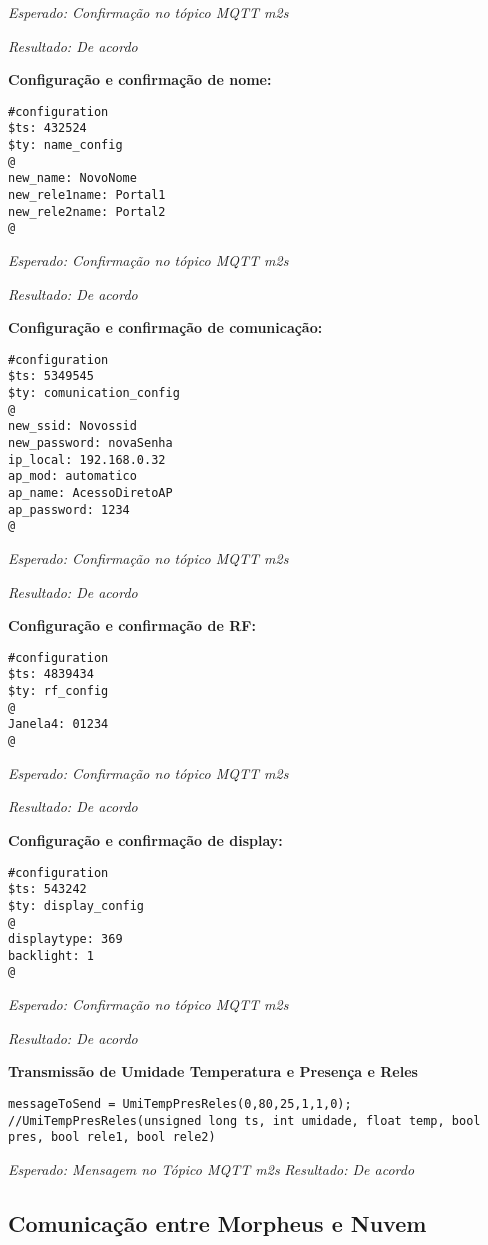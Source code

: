 \textit{Esperado: Confirmação no tópico MQTT m2s}

\textit{Resultado: De acordo}

\textbf{Configuração e confirmação de nome:}
\begin{lstlisting}
#configuration
$ts: 432524
$ty: name_config
@
new_name: NovoNome
new_rele1name: Portal1
new_rele2name: Portal2
@
\end{lstlisting}

\textit{Esperado: Confirmação no tópico MQTT m2s}

\textit{Resultado: De acordo}

\textbf{Configuração e confirmação de comunicação:}
\begin{lstlisting}
#configuration
$ts: 5349545
$ty: comunication_config
@
new_ssid: Novossid
new_password: novaSenha
ip_local: 192.168.0.32
ap_mod: automatico
ap_name: AcessoDiretoAP
ap_password: 1234
@
\end{lstlisting}

\textit{Esperado: Confirmação no tópico MQTT m2s}

\textit{Resultado: De acordo}

\textbf{Configuração e confirmação de RF:}
\begin{lstlisting}
#configuration
$ts: 4839434
$ty: rf_config
@
Janela4: 01234
@
\end{lstlisting}

\textit{Esperado: Confirmação no tópico MQTT m2s}

\textit{Resultado: De acordo}

\textbf{Configuração e confirmação de display:}
\begin{lstlisting}
#configuration
$ts: 543242
$ty: display_config
@
displaytype: 369
backlight: 1
@
\end{lstlisting}

\textit{Esperado: Confirmação no tópico MQTT m2s}

\textit{Resultado: De acordo}

\textbf{Transmissão de Umidade Temperatura e Presença e Reles}
\begin{lstlisting}
messageToSend = UmiTempPresReles(0,80,25,1,1,0);
//UmiTempPresReles(unsigned long ts, int umidade, float temp, bool pres, bool rele1, bool rele2)
\end{lstlisting}

\textit{Esperado: Mensagem no Tópico MQTT m2s}
\textit{Resultado: De acordo}


\subsection{Comunicação entre Morpheus e Nuvem}

